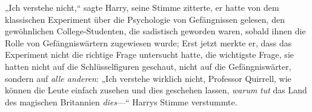 „Ich verstehe nicht,“ sagte Harry, seine Stimme zitterte, er hatte von dem klassischen Experiment über die Psychologie von Gefängnissen gelesen, den gewöhnlichen College-Studenten, die sadistisch geworden waren, sobald ihnen die Rolle von Gefängniswärtern zugewiesen wurde; Erst jetzt merkte er, dass das Experiment nicht die richtige Frage untersucht hatte, die wichtigste Frage, sie hatten nicht auf die Schlüsselfiguren geschaut, nicht auf die Gefängniswärter, sondern auf \emph{alle anderen}: „Ich verstehe wirklich nicht, Professor Quirrell, wie können die Leute einfach zusehen und dies geschehen lassen, \emph{warum} \emph{tut} das Land des magischen Britannien \emph{dies}—“ Harrys Stimme verstummte.


